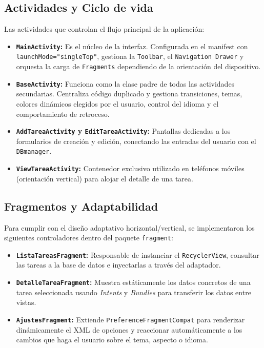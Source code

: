 \documentclass{article}
\begin{document}
\subsection{Actividades y Ciclo de vida}

Las actividades que controlan el flujo principal de la aplicación:

\begin{itemize}
    \item \textbf{\texttt{MainActivity}:} Es el núcleo de la interfaz. Configurada en el manifest con \texttt{launchMode="singleTop"}, gestiona la \texttt{Toolbar}, el \texttt{Navigation Drawer} y orquesta la carga de \texttt{Fragments} dependiendo de la orientación del dispositivo.
    \item \textbf{\texttt{BaseActivity}:} Funciona como la clase padre de todas las actividades secundarias. Centraliza código duplicado y gestiona transiciones, temas, colores dinámicos elegidos por el usuario, control del idioma y el comportamiento de retroceso.
    \item \textbf{\texttt{AddTareaActivity} y \texttt{EditTareaActivity}:} Pantallas dedicadas a los formularios de creación y edición, conectando las entradas del usuario con el \texttt{DBmanager}.
    \item \textbf{\texttt{ViewTareaActivity}:} Contenedor exclusivo utilizado en teléfonos móviles (orientación vertical) para alojar el detalle de una tarea.
\end{itemize}

\subsection{Fragmentos y Adaptabilidad}

Para cumplir con el diseño adaptativo horizontal/vertical, se implementaron los siguientes controladores dentro del paquete \texttt{fragment}:

\begin{itemize}
    \item \textbf{\texttt{ListaTareasFragment}:} Responsable de instanciar el \texttt{RecyclerView}, consultar las tareas a la base de datos e inyectarlas a través del adaptador.
    \item \textbf{\texttt{DetalleTareaFragment}:} Muestra estáticamente los datos concretos de una tarea seleccionada usando \textit{Intents} y \textit{Bundles} para transferir los datos entre vistas.
    \item \textbf{\texttt{AjustesFragment}:} Extiende \texttt{Preference\allowbreak Fragment\allowbreak Compat} para renderizar dinámicamente el XML de opciones y reaccionar automáticamente a los cambios que haga el usuario sobre el tema, aspecto o idioma.
\end{itemize}
\end{document}

